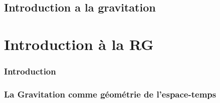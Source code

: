 \documentclass[a4paper,12pt]{report}
\theoremstyle{plain}
\theoremstyle{plain}
\begin{document}
 
 
\chapter{ Introduction a la gravitation }\label{chapitre1}
\minitoc 
\part{Introduction \`a la RG}
\minitoc 
\section{Introduction}



\section{La Gravitation comme g\'eom\'etrie de l'espace-temps}
\end{document}
